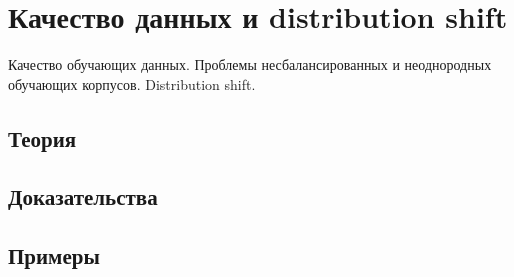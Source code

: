 
\section{Качество данных и distribution shift}
\label{sec:2.5.07-data-quality-shift}

\begin{ticket}
Качество обучающих данных. Проблемы несбалансированных и неоднородных обучающих корпусов. Distribution shift.
\end{ticket}

\subsection*{Теория}

\subsection*{Доказательства}

\subsection*{Примеры}
